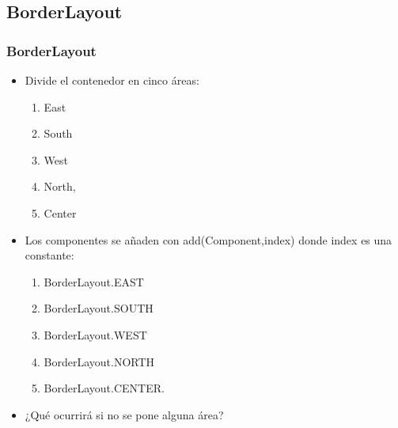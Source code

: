 \documentclass{beamer}
\begin{document}
\subsection{BorderLayout}
\begin{frame}[fragile]
    \frametitle{BorderLayout}
       \begin{itemize}[<+->]
       \item Divide el contenedor en cinco áreas:
       \begin{enumerate}
\item East
\item South
\item West
\item North,
\item Center
\end{enumerate}
\item Los componentes se añaden con \alert{add(Component,index)} donde  index es una constante:
\begin{enumerate}
\item BorderLayout.EAST
\item BorderLayout.SOUTH
\item BorderLayout.WEST
\item BorderLayout.NORTH
\item BorderLayout.CENTER.
\end{enumerate}
\item ¿Qué ocurrirá si no se pone alguna área?
       \end{itemize}
 
\end{frame}
\end{document}
